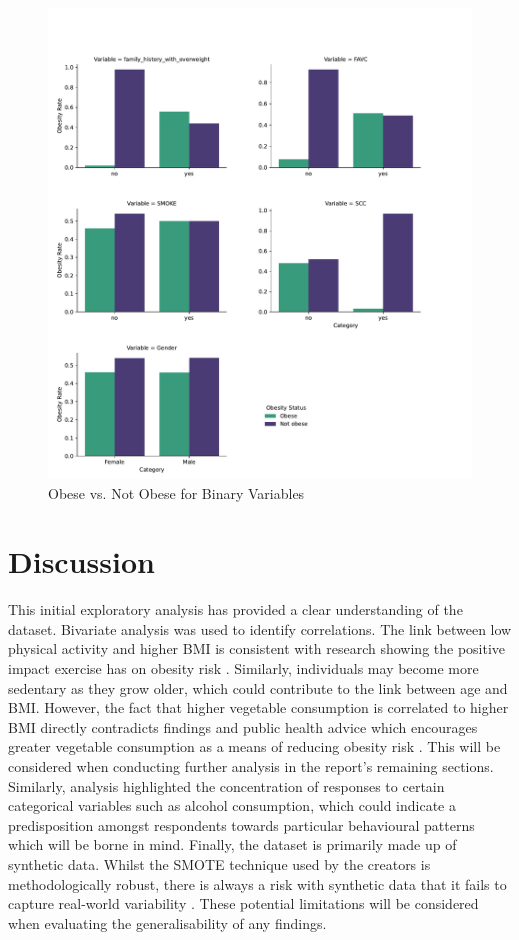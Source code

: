 \begin{figure}
  \centering
  \includegraphics[width=1\textwidth]{binary_obesity.pdf}
  \caption{Obese vs. Not Obese for Binary Variables}
  \label{fig:binary_obesity}
\end{figure}

\FloatBarrier
\section{Discussion}

This initial exploratory analysis has provided a clear understanding of the dataset. Bivariate analysis was used to identify correlations. The link between low physical activity and higher BMI is consistent with research showing the positive impact exercise has on obesity risk \cite{Bergens2020}. Similarly, individuals may become more sedentary as they grow older, which could contribute to the link between age and BMI. However, the fact that higher vegetable consumption is correlated to higher BMI directly contradicts findings and public health advice which encourages greater vegetable consumption as a means of reducing obesity risk \cite{Nour2018}. This will be considered when conducting further analysis in the report's remaining sections. Similarly, analysis highlighted the concentration of responses to certain categorical variables such as alcohol consumption, which could indicate a predisposition amongst respondents towards particular behavioural patterns which will be borne in mind. Finally, the dataset is primarily made up of synthetic data. Whilst the SMOTE technique used by the creators is methodologically robust, there is always a risk with synthetic data that it fails to capture real-world variability \cite{Giuffre2023}. These potential limitations will be considered when evaluating the generalisability of any findings.

